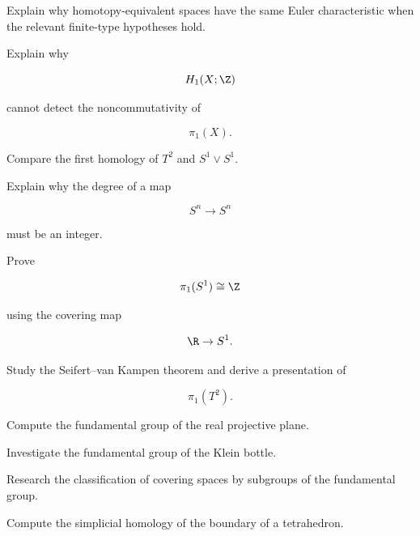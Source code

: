\begin{exercise}[3]
Explain why homotopy-equivalent spaces have the same Euler characteristic
when the relevant finite-type hypotheses hold.
\end{exercise}

\begin{exercise}[3]
Explain why

\[
H_1(X;\Z)
\]

cannot detect the noncommutativity of

\[
\pi_1(X).
\]
\end{exercise}

\begin{exercise}[3]
Compare the first homology of \(T^2\) and \(S^1\vee S^1\).
\end{exercise}

\begin{exercise}[3]
Explain why the degree of a map

\[
S^n\to S^n
\]

must be an integer.
\end{exercise}

\begin{exercise}[4]
Prove

\[
\pi_1(S^1)\cong\Z
\]

using the covering map

\[
\R\to S^1.
\]
\end{exercise}

\begin{exercise}[4]
Study the Seifert--van Kampen theorem and derive a presentation of

\[
\pi_1(T^2).
\]
\end{exercise}

\begin{exercise}[4]
Compute the fundamental group of the real projective plane.
\end{exercise}

\begin{exercise}[4]
Investigate the fundamental group of the Klein bottle.
\end{exercise}

\begin{exercise}[4]
Research the classification of covering spaces by subgroups of the
fundamental group.
\end{exercise}

\begin{exercise}[4]
Compute the simplicial homology of the boundary of a tetrahedron.
\end{exercise}

